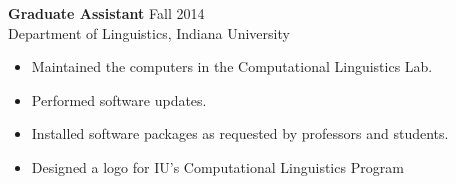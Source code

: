 \begin{singlespace}
\vspace{6pt}
\noindent\textbf{Graduate Assistant} \hfill Fall 2014 \\
Department of Linguistics, Indiana University
\begin{itemize} \itemsep2pt
\item Maintained the computers in the Computational Linguistics Lab. 
\item Performed software updates. 
\item Installed software packages as requested by professors and students.
\item Designed a logo for IU's Computational Linguistics Program %
\end{itemize}
\thispagestyle{empty}


\end{singlespace}
